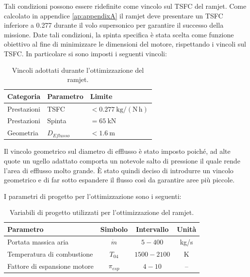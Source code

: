 Tali condizioni possono essere ridefinite come vincolo sul TSFC del ramjet. Come calcolato in appendice \ref{ap:appendixA} il ramjet deve presentare un TSFC inferiore a 0.277 durante il volo supersonico per garantire il successo della missione. Date tali condizioni, la spinta specifica è stata scelta come funzione obiettivo al fine di minimizzare le dimensioni del motore, rispettando i vincoli sul TSFC. In particolare si sono imposti i seguenti vincoli:

\begin{table}[H]
\centering
\fontsize{11pt}{11pt}\selectfont
\renewcommand{\arraystretch}{1}
\caption{Vincoli adottati durante l'ottimizzazione del ramjet.}
\label{tab:vincoli_ramjet2}
\begin{tabular}{lll}
\toprule
\textbf{Categoria} & \textbf{Parametro} & \textbf{Limite} \\
\midrule

Prestazioni
& TSFC
& $<0.277\ \mathrm{kg/(N\,h)}$ \\

Prestazioni
& Spinta
& $ = 65\ \mathrm{kN}$ \\


Geometria
& $D_{Eflusso}$
& $<1.6\ \mathrm{m}$ \\

\bottomrule
\end{tabular}
\end{table}

Il vincolo geometrico sul diametro di efflusso è stato imposto poiché, ad alte quote un ugello adattato comporta un notevole salto di pressione il quale rende l'area di efflusso molto grande. È stato quindi deciso di introdurre un vincolo geometrico e di far sotto espandere il flusso così da garantire aree più piccole.

I parametri di progetto per l'ottimizzazione sono i 
seguenti:
\begin{table}[H]
\centering
\fontsize{11pt}{11pt}\selectfont
\renewcommand{\arraystretch}{1}
\caption{Variabili di progetto utilizzati per l'ottimizzazione del ramjet.}
\label{tab:var_turbojet}
\begin{tabular}{lccc}
\toprule
\textbf{Parametro} & \textbf{Simbolo} & \textbf{Intervallo} & \textbf{Unità} \\
\midrule

Portata massica aria &
$\dot{m}$ &
$5 - 400$ &
kg/s \\

Temperatura di combustione &
$T_{04}$ &
$1500 - 2100$ &
K \\

Fattore di espansione motore &
$\pi_{esp}$ &
$4 - 10$ & 
-- \\

\bottomrule
\end{tabular}
\end{table}

